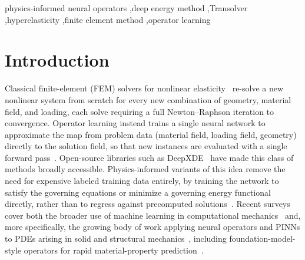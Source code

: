 \documentclass[final,5p,times]{elsarticle}
\begin{document}
\begin{frontmatter}
\begin{keyword}
physics-informed neural operators \sep deep energy method \sep Transolver \sep hyperelasticity \sep finite element method \sep operator learning
\end{keyword}

\end{frontmatter}

\FloatBarrier
\section{Introduction}
\label{sec:intro}

Classical finite-element (FEM) solvers for nonlinear
elasticity~\cite{bathe1996finite,belytschko2014nonlinear,zienkiewicz2013finite}
re-solve a new nonlinear system from scratch for every new combination of
geometry, material field, and loading, each solve requiring a full
Newton\mbox{--}Raphson iteration to convergence. Operator learning instead trains
a single neural
network to approximate the map from problem data (material field, loading
field, geometry) directly to the solution field, so that new instances are
evaluated with a single forward
pass~\cite{lu2021deeponet,li2021fno,li2020graphkernel,kovachki2023neuraloperator}.
Open-source libraries such as DeepXDE~\cite{lu2021deepxde} have made this
class of methods broadly accessible. Physics-informed variants of this
idea remove the need for expensive labeled training data entirely, by
training the network to satisfy the governing equations or minimize a
governing energy functional directly, rather than to regress against
precomputed
solutions~\cite{raissi2019pinn,e2018deepritz,goswami2023pideeponet,boya2024pinto}.
Recent surveys cover both the broader use of machine learning in
computational mechanics~\cite{rabczuk2023ml} and, more specifically, the
growing body of work applying neural operators and PINNs to PDEs arising
in solid and structural mechanics~\cite{wang2026review}, including
foundation-model-style operators for rapid material-property
prediction~\cite{wang2024homogenius}.
\end{document}
